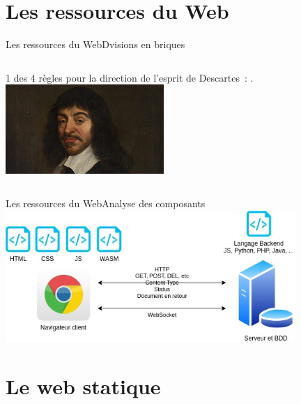 \documentclass{beamer}
\begin{document}
\section{Les ressources du Web}\label{sec:ressources}

\begin{frame}{Les ressources du Web}{Dvisions en briques}
    \begin{columns}
        1 des 4 règles pour la direction de l'esprit de Descartes~: .
        \centering
        \includegraphics[width=6cm]{image/Descartes}
    \end{columns}
\end{frame}

\begin{frame}{Les ressources du Web}{Analyse des composants}
    \centering
    \includegraphics[width=11cm]{image/web-stakeholders.drawio}
\end{frame}

\section{Le web statique}\label{sec:static}
\end{document}
